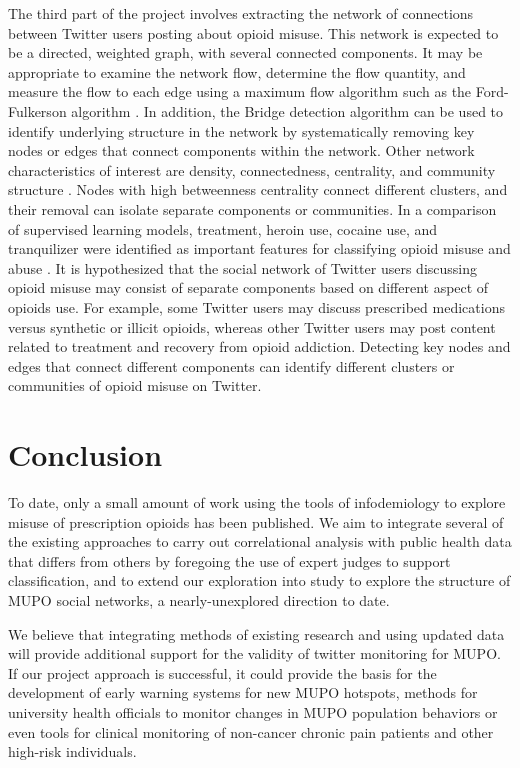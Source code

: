 \documentclass[sigconf]{acmart}
\begin{document}
The third part of the project involves extracting the network of connections 
between Twitter users posting about opioid misuse. This network is expected to 
be a directed, weighted graph, with several connected components. It may be 
appropriate to examine the network flow, determine the flow quantity, and 
measure the flow to each edge using a maximum flow algorithm such as the Ford-
Fulkerson algorithm \cite{zafarani14}. In addition, the Bridge detection 
algorithm can be used to identify underlying structure in the network by 
systematically removing key nodes or edges that connect components within the 
network. Other network characteristics of interest are density, connectedness, 
centrality, and community structure \cite{golbeck13}. Nodes with high 
betweenness centrality connect different clusters, and their removal can
isolate separate components or communities. In a comparison of supervised 
learning models, treatment, heroin use, cocaine use, and tranquilizer were 
identified as important features for classifying opioid misuse and abuse 
\cite{shiverick17}. It is hypothesized that the social network of Twitter 
users discussing opioid misuse may consist of separate components based on 
different aspect of opioids use. For example, some Twitter users may discuss 
prescribed medications versus synthetic or illicit opioids, whereas other 
Twitter users may post content related to treatment and recovery from opioid 
addiction. Detecting key nodes and edges that connect different components 
can identify different clusters or communities of opioid misuse on Twitter.

\section{Conclusion}

To date, only a small amount of work using the tools of infodemiology to 
explore misuse of prescription opioids has been published. We aim to integrate 
several of the existing approaches to carry out correlational analysis with 
public health data that differs from others by foregoing the use of expert 
judges to support classification, and to extend our exploration into study to 
explore the structure of MUPO social networks, a nearly-unexplored direction 
to date. 

We believe that integrating methods of existing research and using 
updated data will provide additional support for the validity of twitter 
monitoring for MUPO. If our project approach is successful, it could provide 
the basis for the development of early warning systems for new MUPO hotspots, 
methods for university health officials to monitor changes in MUPO population 
behaviors or even tools for clinical monitoring of non-cancer chronic pain 
patients and other high-risk individuals. 
 
\end{document}

